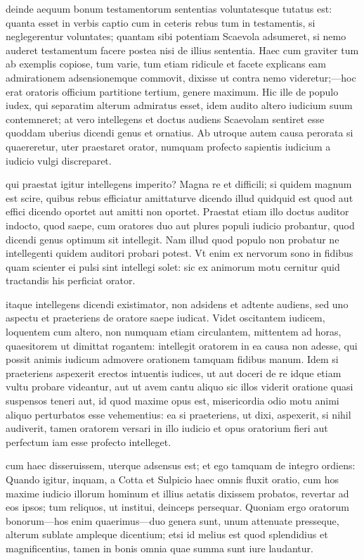  deinde aequum bonum testamentorum sententias voluntatesque tutatus est: quanta esset in verbis captio cum in ceteris rebus tum in testamentis, si neglegerentur voluntates; quantam sibi potentiam Scaevola adsumeret, si nemo auderet testamentum facere postea nisi de illius sententia. Haec cum graviter tum ab exemplis copiose, tum varie, tum etiam ridicule et facete explicans eam admirationem adsensionemque commovit, dixisse ut contra nemo videretur;—hoc erat oratoris officium partitione tertium, genere maximum. Hic ille de populo iudex, qui separatim alterum admiratus esset, idem audito altero iudicium suum contemneret; at vero intellegens et doctus audiens Scaevolam sentiret esse quoddam uberius dicendi genus et ornatius. Ab utroque autem causa perorata si quaereretur, uter praestaret orator, numquam profecto sapientis iudicium a iudicio vulgi discreparet.

 qui praestat igitur intellegens imperito? Magna re et difficili; si quidem magnum est scire, quibus rebus efficiatur amittaturve dicendo illud quidquid est quod aut effici dicendo oportet aut amitti non oportet. Praestat etiam illo doctus auditor indocto, quod saepe, cum oratores duo aut plures populi iudicio probantur, quod dicendi genus optimum sit intellegit. Nam illud quod populo non probatur ne intellegenti quidem auditori probari potest. Vt enim ex nervorum sono in fidibus quam scienter ei pulsi sint intellegi solet: sic ex animorum motu cernitur quid tractandis his perficiat orator.

 itaque intellegens dicendi existimator, non adsidens et adtente audiens, sed uno aspectu et praeteriens de oratore saepe iudicat. Videt oscitantem iudicem, loquentem cum altero, non numquam etiam circulantem, mittentem ad horas, quaesitorem ut dimittat rogantem: intellegit oratorem in ea causa non adesse, qui possit animis iudicum admovere orationem tamquam fidibus manum. Idem si praeteriens aspexerit erectos intuentis iudices, ut aut doceri de re idque etiam vultu probare videantur, aut ut avem cantu aliquo sic illos viderit oratione quasi suspensos teneri aut, id quod maxime opus est, misericordia odio motu animi aliquo perturbatos esse vehementius: ea si praeteriens, ut dixi, aspexerit, si nihil audiverit, tamen oratorem versari in illo iudicio et opus oratorium fieri aut perfectum iam esse profecto intelleget.

 cum haec disseruissem, uterque adsensus est; et ego tamquam de integro ordiens: Quando igitur, inquam, a Cotta et Sulpicio haec omnis fluxit oratio, cum hos maxime iudicio illorum hominum et illius aetatis dixissem probatos, revertar ad eos ipsos; tum reliquos, ut institui, deinceps persequar. Quoniam ergo oratorum bonorum—hos enim quaerimus—duo genera sunt, unum attenuate presseque, alterum sublate ampleque dicentium; etsi id melius est quod splendidius et magnificentius, tamen in bonis omnia quae summa sunt iure laudantur.

